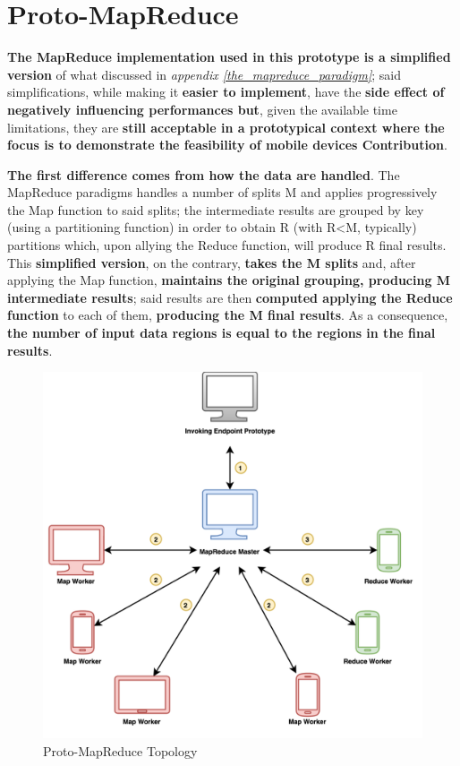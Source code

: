 \section{Proto-MapReduce}
\textbf{The MapReduce implementation used in this prototype is a simplified version} of what discussed in \textit{appendix \ref{the_mapreduce_paradigm}}; said simplifications, while making it \textbf{easier to implement}, have the \textbf{side effect of negatively influencing performances but}, given the available time limitations, they are \textbf{still acceptable in a prototypical context where the focus is to demonstrate the feasibility of mobile devices Contribution}.

\textbf{The first difference comes from how the data are handled}. The MapReduce paradigms handles a number of splits M and applies progressively the Map function to said splits; the intermediate results are grouped by key (using a partitioning function) in order to obtain R (with R<M, typically) partitions which, upon allying the Reduce function, will produce R final results. This \textbf{simplified version}, on the contrary, \textbf{takes the M splits} and, after applying the Map function, \textbf{maintains the original grouping, producing M intermediate results}; said results are then \textbf{computed applying the Reduce function} to each of them, \textbf{producing the M final results}. As a consequence, \textbf{the number of input data regions is equal to the regions in the final results}.

\vspace{10mm}

\begin{figure}[!ht]
    \centering
    \includegraphics[scale=1]{document/chapters/chapter_6/images/proto_mapreduce.png}
    \caption{Proto-MapReduce Topology}
    \label{fig:proto_mapreduce}
\end{figure}

